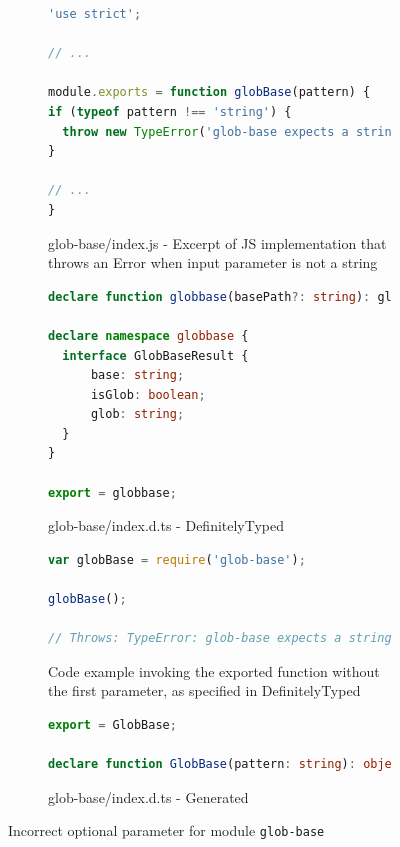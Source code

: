 \documentclass[sigconf]{acmart}
\begin{document}
\begin{figure}[tp]
  \centering
  \begin{subfigure}[t]{0.48\linewidth}
    \begin{lstlisting}[language=TypeScript,numbers=none]
'use strict';

// ...

module.exports = function globBase(pattern) {
if (typeof pattern !== 'string') {
  throw new TypeError('glob-base expects a string.');
}

// ...
} 
    \end{lstlisting}
    \caption{glob-base/index.js - Excerpt of JS implementation
      that throws an Error when input parameter is not a string} 
    \label{fig:subfloat-globbase-js-implementation}
  \end{subfigure}
  \hfill
  \begin{subfigure}[t]{0.48\linewidth}
    \begin{lstlisting}[language=TypeScript,numbers=none]
declare function globbase(basePath?: string): globbase.GlobBaseResult;

declare namespace globbase {
  interface GlobBaseResult {
      base: string;
      isGlob: boolean;
      glob: string;
  }
}

export = globbase;
    \end{lstlisting}
    \caption{glob-base/index.d.ts - DefinitelyTyped}
  \end{subfigure}

\begin{subfigure}[t]{0.48\linewidth}
    \begin{lstlisting}[language=JavaScript,numbers=none]
var globBase = require('glob-base');

globBase();

// Throws: TypeError: glob-base expects a string.
    \end{lstlisting}
    \caption{Code example invoking the exported function without the first parameter, as specified in DefinitelyTyped}
  \end{subfigure}
  \hfill
  \begin{subfigure}[t]{0.48\linewidth}
    \begin{lstlisting}[language=TypeScript,numbers=none]
export = GlobBase;

declare function GlobBase(pattern: string): object;
    \end{lstlisting}
    \caption{glob-base/index.d.ts - Generated}
  \end{subfigure}
  
  \caption{Incorrect optional parameter for module \texttt{glob-base}}
  \label{fig:experiments-results-module-glob-base}
\end{figure}
\end{document}

